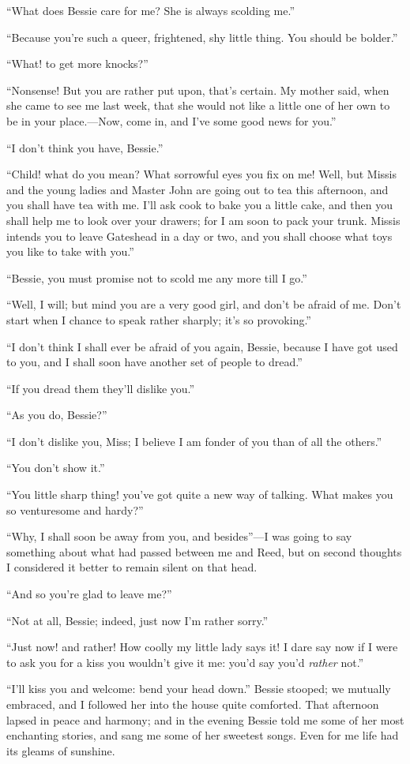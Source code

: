 \enquote{What does Bessie care for me? She is always scolding me.}

\enquote{Because you're such a queer, frightened, shy little thing. You
	should be bolder.}

\enquote{What! to get more knocks?}

\enquote{Nonsense! But you are rather put upon, that's certain. My
	mother said, when she came to see me last week, that she would not like
	a little one of her own to be in your place.---Now, come in, and I've
	some good news for you.}

\enquote{I don't think you have, Bessie.}

\enquote{Child! what do you mean? What sorrowful eyes you fix on me!
	Well, but Missis and the young ladies and Master John are going out to
	tea this afternoon, and you shall have tea with me. I'll ask cook to
	bake you a little cake, and then you shall help me to look over your
	drawers; for I am soon to pack your trunk. Missis intends you to leave
	Gateshead in a day or two, and you shall choose what toys you like to
	take with you.}

\enquote{Bessie, you must promise not to scold me any more till I go.}

\enquote{Well, I will; but mind you are a very good girl, and don't be
	afraid of me. Don't start when I chance to speak rather sharply; it's
	so provoking.}

\enquote{I don't think I shall ever be afraid of you again, Bessie,
	because I have got used to you, and I shall soon have another set of
	people to dread.}

\enquote{If you dread them they'll dislike you.}

\enquote{As you do, Bessie?}

\enquote{I don't dislike you, Miss; I believe I am fonder of you than of
	all the others.}

\enquote{You don't show it.}

\enquote{You little sharp thing! you've got quite a new way of talking.
	What makes you so venturesome and hardy?}

\enquote{Why, I shall soon be away from you, and besides}---I was going
to say something about what had passed between me and \Mrs{} Reed, but on
second thoughts I considered it better to remain silent on that head.

\enquote{And so you're glad to leave me?}

\enquote{Not at all, Bessie; indeed, just now I'm rather sorry.}

\enquote{Just now! and rather! How coolly my little lady says it! I dare say
	now if I were to ask you for a kiss you wouldn't give it me: you'd say
	you'd \emph{rather} not.}

\enquote{I'll kiss you and welcome: bend your head down.} Bessie
stooped; we mutually embraced, and I followed her into the house quite
comforted. That afternoon lapsed in peace and harmony; and in the
evening Bessie told me some of her most enchanting stories, and sang me
some of her sweetest songs. Even for me life had its gleams of
sunshine.
